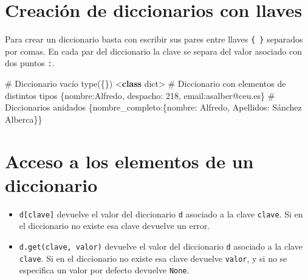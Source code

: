 \documentclass[
  spanish,
  a4paper,
]{scrreport}
\newenvironment{Shaded}{\begin{snugshade}}{\end{snugshade}}
\newcommand{\BuiltInTok}[1]{\textcolor[rgb]{0.00,0.23,0.31}{#1}}
\newcommand{\CommentTok}[1]{\textcolor[rgb]{0.37,0.37,0.37}{#1}}
\newcommand{\DecValTok}[1]{\textcolor[rgb]{0.68,0.00,0.00}{#1}}
\newcommand{\KeywordTok}[1]{\textcolor[rgb]{0.00,0.23,0.31}{\textbf{#1}}}
\newcommand{\NormalTok}[1]{\textcolor[rgb]{0.00,0.23,0.31}{#1}}
\newcommand{\OperatorTok}[1]{\textcolor[rgb]{0.37,0.37,0.37}{#1}}
\newcommand{\StringTok}[1]{\textcolor[rgb]{0.13,0.47,0.30}{#1}}
\providecommand{\tightlist}{%
  \setlength{\itemsep}{0pt}\setlength{\parskip}{0pt}}
\begin{document}
\section{Creación de diccionarios con
llaves}\label{creaciuxf3n-de-diccionarios-con-llaves}

Para crear un diccionario basta con escribir sus pares entre llaves
\texttt{\{\ \}} separados por comas. En cada par del diccionario la
clave se separa del valor asociado con dos puntos \texttt{:}.

\begin{Shaded}
\begin{Highlighting}[]
\CommentTok{\# Diccionario vacío}
\BuiltInTok{type}\NormalTok{(\{\})}
\OperatorTok{\textless{}}\KeywordTok{class} \StringTok{\textquotesingle{}dict\textquotesingle{}}\OperatorTok{\textgreater{}}
\CommentTok{\# Diccionario con elementos de distintos tipos}
\NormalTok{\{}\StringTok{\textquotesingle{}nombre\textquotesingle{}}\NormalTok{:}\StringTok{\textquotesingle{}Alfredo\textquotesingle{}}\NormalTok{, }\StringTok{\textquotesingle{}despacho\textquotesingle{}}\NormalTok{: }\DecValTok{218}\NormalTok{, }\StringTok{\textquotesingle{}email\textquotesingle{}}\NormalTok{:}\StringTok{\textquotesingle{}asalber@ceu.es\textquotesingle{}}\NormalTok{\}}
\CommentTok{\# Diccionarios anidados}
\NormalTok{\{}\StringTok{\textquotesingle{}nombre\_completo\textquotesingle{}}\NormalTok{:\{}\StringTok{\textquotesingle{}nombre\textquotesingle{}}\NormalTok{: }\StringTok{\textquotesingle{}Alfredo\textquotesingle{}}\NormalTok{, }\StringTok{\textquotesingle{}Apellidos\textquotesingle{}}\NormalTok{: }\StringTok{\textquotesingle{}Sánchez Alberca\textquotesingle{}}\NormalTok{\}\}}
\end{Highlighting}
\end{Shaded}

\section{Acceso a los elementos de un
diccionario}\label{acceso-a-los-elementos-de-un-diccionario}

\begin{itemize}
\tightlist
\item
  \texttt{d{[}clave{]}} devuelve el valor del diccionario \texttt{d}
  asociado a la clave \texttt{clave}. Si en el diccionario no existe esa
  clave devuelve un error.
\item
  \texttt{d.get(clave,\ valor)} devuelve el valor del diccionario
  \texttt{d} asociado a la clave \texttt{clave}. Si en el diccionario no
  existe esa clave devuelve \texttt{valor}, y si no se especifica un
  valor por defecto devuelve \texttt{None}.
\end{itemize}
\end{document}
